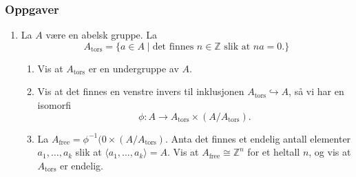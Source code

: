 \subsubsection*{Oppgaver}
\begin{enumerate}
    \item La $A$ være en abelsk gruppe. La
        \[
            A_{\mathrm{tors}} = \{a\in A\mid \mbox{det finnes $n\in \mathbb Z$ slik at $na = 0$.}\}
        \]
        \begin{enumerate}
            \item Vis at $A_{\mathrm{tors}}$ er en undergruppe av $A$.
            \item Vis at det finnes en venstre invers til inklusjonen
                $A_{\mathrm{tors}}\hookrightarrow A$,
                så vi har en isomorfi
                \[
                    \phi \colon A\to A_{\mathrm{tors}}\times (A / A_{\mathrm{tors}}).
                \]
            \item La $A_{\mathrm{free}} = \phi^{-1}(0\times (A / A_{\mathrm{tors}})$.
                Anta det finnes et endelig antall elementer $a_1,\dots,a_k$
                slik at $\langle a_1,\dots, a_k\rangle = A$.
                Vis at $A_{\mathrm{free}} \cong \mathbb Z^n$ for et heltall $n$,
                og vis at $A_{\mathrm{tors}}$ er endelig.
        \end{enumerate}
\end{enumerate}

